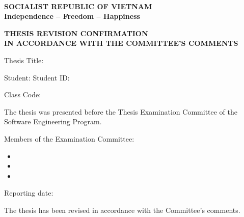 \clearpage{}
\thispagestyle{thesisplain}
\begingroup{}\fontsize{13bp}{17bp}\selectfont
\noindent\begin{minipage}[t]{.48\textwidth}\centering
  \textbf{\UniversityName\\\CollegeName}
\end{minipage}\hfill
\begin{minipage}[t]{.48\textwidth}\centering
  \textbf{SOCIALIST REPUBLIC OF VIETNAM\\Independence -- Freedom -- Happiness}
\end{minipage}
\par\vspace{12mm}
{\centering\fontsize{14bp}{18bp}\selectfont\bfseries
  THESIS REVISION CONFIRMATION\\IN ACCORDANCE WITH THE COMMITTEE'S COMMENTS\par}
\vspace{8mm}
\noindent Thesis Title: \ThesisTitle\par
\noindent Student: \StudentName\hfill Student ID: \StudentId\hspace{1.5cm}\par
\noindent Class Code: \StudentClassCode\par
\noindent The thesis was presented before the Thesis Examination Committee of the
Software Engineering Program.\par
\noindent Members of the Examination Committee:
\begin{itemize}\setlength{\itemsep}{0pt}
  \item \CommitteeMemberOne
  \item \CommitteeMemberTwo
  \item \CommitteeMemberThree
\end{itemize}
\noindent Reporting date: \DefenseDate\par
\noindent The thesis has been revised in accordance with the Committee's comments.
\endgroup
